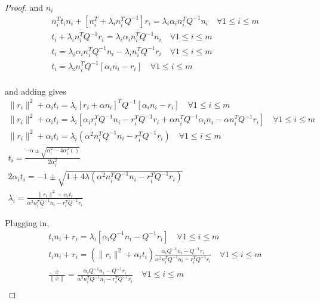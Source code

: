 \begin{proof}
and $n_i$
\begin{align*}
n_i^Tt_in_i + \left[n_i^T + \lambda_i n_i^TQ^{-1}\right]r_i = \lambda_i\alpha_i n_i^TQ^{-1} n_i \quad \forall 1\le i\le m \\
t_i + \lambda_i n_i^TQ^{-1}r_i = \lambda_i\alpha_i n_i^TQ^{-1} n_i \quad \forall 1\le i\le m \\
t_i = \lambda_i\alpha_i n_i^TQ^{-1} n_i - \lambda_i n_i^TQ^{-1}r_i \quad \forall 1\le i\le m \\
t_i = \lambda_in_i^TQ^{-1}\left[\alpha_i n_i - r_i\right] \quad \forall 1\le i\le m \\
\end{align*}

and adding gives
\begin{align*}
\|r_i\|^2  + \alpha_i t_i = \lambda_i\left[r_i + \alpha n_i\right]^TQ^{-1}\left[\alpha_i n_i - r_i\right] \quad \forall 1\le i\le m \\
\|r_i\|^2  + \alpha_i t_i = \lambda_i\left[ \alpha_ir_i^T Q^{-1} n_i - r_i^T Q^{-1}r_i  + \alpha n_i^TQ^{-1}\alpha_i n_i - \alpha n_i^TQ^{-1}r_i   \right] \quad \forall 1\le i\le m \\
\|r_i\|^2  + \alpha_i t_i = \lambda_i\left(\alpha^2 n_i^TQ^{-1} n_i - r_i^T Q^{-1}r_i  \right) \quad \forall 1\le i\le m \\
t_i = \frac{-\alpha \pm \sqrt{\alpha_i^2 - 4\alpha_i^2()}}{2\alpha_i^2} \\
2\alpha_it_i = -1 \pm \sqrt{1 + 4\lambda(\alpha^2 n_i^TQ^{-1} n_i - r_i^T Q^{-1}r_i)} \\
\lambda_i = \frac{\|r_i\|^2  + \alpha_i t_i}{\alpha^2 n_i^TQ^{-1} n_i - r_i^T Q^{-1}r_i}
\end{align*}

Plugging in,
\begin{align*}
t_in_i + r_i = \lambda_i \left[\alpha_i Q^{-1} n_i - Q^{-1}r_i \right] \quad \forall 1\le i\le m \\
t_in_i + r_i = (\|r_i\|^2  + \alpha_i t_i)\frac{\alpha_i Q^{-1} n_i - Q^{-1}r_i}{\alpha^2 n_i^TQ^{-1} n_i - r_i^T Q^{-1}r_i} \quad \forall 1\le i\le m \\
\frac{\bar x}{\|\bar x\|} = \frac{\alpha_i Q^{-1} n_i - Q^{-1}r_i}{\alpha^2 n_i^TQ^{-1} n_i - r_i^T Q^{-1}r_i} \quad \forall 1\le i\le m \\
\end{align*}



\end{proof}

